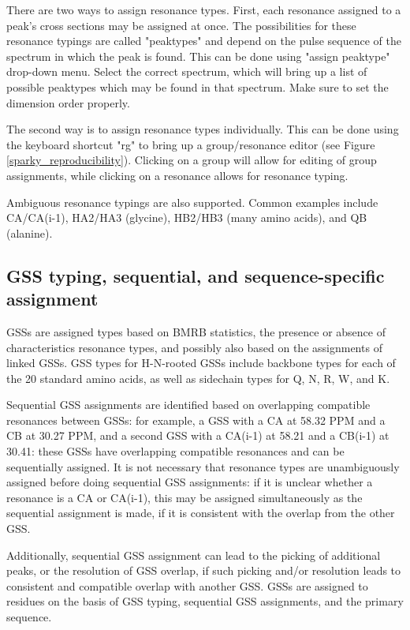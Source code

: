 There are two ways to assign resonance types.  First, each resonance assigned
to a peak's cross sections may be assigned at once.  The possibilities
for these resonance typings are called "peaktypes" and depend on the pulse 
sequence of the spectrum in which the peak is found.
This can be done using "assign peaktype" drop-down menu.  Select the correct
spectrum, which will bring up a list of possible peaktypes which may be found
in that spectrum.  Make sure to set the dimension order properly.

The second way is to assign resonance types individually.  This can be done 
using the keyboard shortcut "rg" to bring up a group/resonance editor
(see Figure \ref{sparky_reproducibility}).  Clicking on a group will allow
for editing of group assignments, while clicking on a resonance allows for
resonance typing.

Ambiguous resonance typings are also supported.  Common examples include
CA/CA(i-1), HA2/HA3 (glycine), HB2/HB3 (many amino acids), and QB (alanine).

\subsection*{GSS typing, sequential, and sequence-specific assignment}
GSSs are assigned types based on BMRB statistics, the presence or absence of
characteristics resonance types, and possibly also based on the assignments 
of linked GSSs.
GSS types for H-N-rooted GSSs include backbone types for each of the 20 
standard amino acids, as well as sidechain types for Q, N, R, W, and K.

Sequential GSS assignments are identified based on overlapping compatible
resonances between GSSs: for example, a GSS with a CA at 58.32 PPM and a CB
at 30.27 PPM, and a second GSS with a CA(i-1) at 58.21 and a CB(i-1) at 30.41:
these GSSs have overlapping compatible resonances and can be sequentially
assigned.
It is not necessary that resonance types are unambiguously assigned before
doing sequential GSS assignments: if it is unclear whether a resonance is a
CA or CA(i-1), this may be assigned simultaneously as the sequential assignment
is made, if it is consistent with the overlap from the other GSS.

Additionally, sequential GSS assignment can lead to the picking of additional
peaks, or the resolution of GSS overlap, if such picking and/or resolution
leads to consistent and compatible overlap with another GSS.
GSSs are assigned to residues on the basis of GSS typing, sequential GSS
assignments, and the primary sequence.

